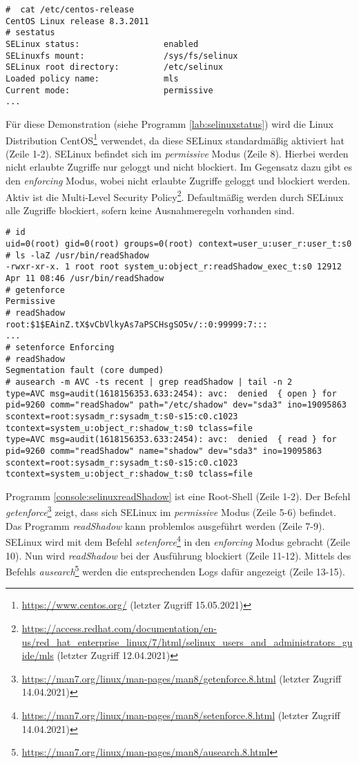 \begin{lstlisting}[label={lab:selinuxstatus}, caption={SElinux Status}]
#  cat /etc/centos-release
CentOS Linux release 8.3.2011
# sestatus
SELinux status:                 enabled
SELinuxfs mount:                /sys/fs/selinux
SELinux root directory:         /etc/selinux
Loaded policy name:             mls
Current mode:                   permissive
...
\end{lstlisting}
Für diese Demonstration (siehe Programm \ref{lab:selinuxstatus}) wird die Linux
Distribution CentOS\footnote{\url{https://www.centos.org/} (letzter Zugriff
15.05.2021)} verwendet, da diese
\mbox{SELinux} standardmäßig aktiviert hat (Zeile 1-2). SELinux befindet sich
im \emph{permissive} Modus (Zeile 8). Hierbei werden nicht erlaubte Zugriffe
nur geloggt und nicht blockiert. Im Gegensatz dazu gibt es den \emph{enforcing}
Modus, wobei nicht erlaubte Zugriffe geloggt und blockiert werden. Aktiv ist
die Multi-Level Security Policy\footnote{\raggedright
\url{https://access.redhat.com/documentation/en-us/red_hat_enterprise_linux/7/html/selinux_users_and_administrators_guide/mls}
(letzter Zugriff 12.04.2021)}. Defaultmäßig werden durch SELinux alle Zugriffe
blockiert, sofern keine Ausnahmeregeln vorhanden sind.

\begin{lstlisting}[label={console:selinuxreadShadow},caption={\emph{readShadow} mit SELinux einschränken}]
# id
uid=0(root) gid=0(root) groups=0(root) context=user_u:user_r:user_t:s0
# ls -laZ /usr/bin/readShadow
-rwxr-xr-x. 1 root root system_u:object_r:readShadow_exec_t:s0 12912 Apr 11 08:46 /usr/bin/readShadow
# getenforce
Permissive
# readShadow
root:$1$EAinZ.tX$vCbVlkyAs7aPSCHsgSO5v/::0:99999:7:::
...
# setenforce Enforcing
# readShadow
Segmentation fault (core dumped)
# ausearch -m AVC -ts recent | grep readShadow | tail -n 2
type=AVC msg=audit(1618156353.633:2454): avc:  denied  { open } for  pid=9260 comm="readShadow" path="/etc/shadow" dev="sda3" ino=19095863 scontext=root:sysadm_r:sysadm_t:s0-s15:c0.c1023 tcontext=system_u:object_r:shadow_t:s0 tclass=file
type=AVC msg=audit(1618156353.633:2454): avc:  denied  { read } for  pid=9260 comm="readShadow" name="shadow" dev="sda3" ino=19095863 scontext=root:sysadm_r:sysadm_t:s0-s15:c0.c1023 tcontext=system_u:object_r:shadow_t:s0 tclass=file
\end{lstlisting} 

Programm \ref{console:selinuxreadShadow} ist eine Root-Shell (Zeile 1-2). Der
Befehl
\emph{getenforce}\footnote{\url{https://man7.org/linux/man-pages/man8/getenforce.8.html}
(letzter Zugriff 14.04.2021)} zeigt, dass sich SELinux im \emph{permissive}
Modus (Zeile 5-6)  befindet. Das Programm \emph{readShadow} kann problemlos
ausgeführt werden (Zeile 7-9). SELinux wird mit dem Befehl
\emph{setenforce}\footnote{\url{https://man7.org/linux/man-pages/man8/setenforce.8.html}
(letzter Zugriff 14.04.2021)} in den \emph{enforcing} Modus gebracht  (Zeile
10). Nun wird \emph{readShadow} bei der Ausführung blockiert (Zeile 11-12).
Mittels des Befehls
\emph{ausearch}\footnote{\url{https://man7.org/linux/man-pages/man8/ausearch.8.html}}
werden die entsprechenden Logs dafür angezeigt (Zeile 13-15).

